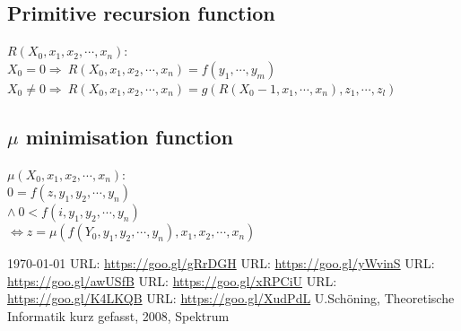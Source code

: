 \documentclass[a4paper,12pt]{scrreprt}
\begin{document}
\subsection*{Primitive recursion function}
$R(X_0,x_1,x_2,\cdots,x_n)$:\\
$X_0=0 \Longrightarrow ~ R(X_0,x_1,x_2,\cdots,x_n) = f(y_1,\cdots,y_m)$\\
$X_0\neq0 \Longrightarrow ~ R(X_0,x_1,x_2,\cdots,x_n) = g(R(X_0-1,x_1,\cdots,x_n),z_1,\cdots,z_l)$
\subsection*{$\mu$ minimisation function}
$\mu(X_0,x_1,x_2,\cdots,x_n)$:\\
$0 = f(z,y_1,y_2,\cdots,y_n) $\\
$\wedge~ 0< f(i,y_1,y_2,\cdots,y_n)$\\
$\Longleftrightarrow z = \mu(f(Y_0,y_1,y_2,\cdots,y_n),x_1,x_2,\cdots,x_n)$

\newpage
	\begin{thebibliography}{xxxx}
			\today
		\bibitem[Picture]{}
			URL: \url{https://goo.gl/gRrDGH}
		\bibitem[Overall]{}
			URL: \url{https://goo.gl/yWvinS}
		\bibitem[Overall]{}
			URL: \url{https://goo.gl/awUSfB}
		\bibitem[Overall]{}
			URL: \url{https://goo.gl/xRPCiU}
		\bibitem[Overall]{}
			URL: \url{https://goo.gl/K4LKQB}
		\bibitem[Overall]{}
			URL: \url{https://goo.gl/XudPdL}
		\bibitem[Overall]{}
			U.Schöning, Theoretische Informatik kurz gefasst, 2008, Spektrum

			
	
\end{thebibliography}
\end{document}

